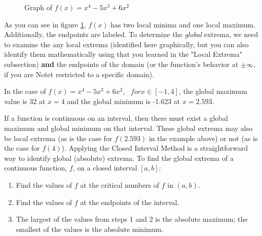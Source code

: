 \begin{figure}[htbp]
  \centering
  \caption{Graph of \( f(x) = x^4-5x^3+6x^2 \) }
  \label{fig:globalext}
\end{figure}

As you can see in figure \ref{fig:globalext}, $f(x)$ has two local minima and 
one local maximum. Additionally, the endpoints are labeled. To determine the 
\textit{global} extrema, we need to examine the any local extrema (identified 
here graphically, but you can also identify them mathematically using that you 
learned in the "Local Extrema" subsection) \textbf{and} the endpoints of the domain (or 
the function's behavior at $\pm \infty$, if you are Notet restricted to a specific 
domain). 

In the case of $f(x) = x^4-5x^3+6x^2,\text{ }for x\in [-1,4]$, the global 
maximum value is 32 at $x=4$ and the global minimum is -1.623 at $x=2.593$. 

If a function is continuous on an interval, then there must exist a global 
maximum and global minimum on that interval. These global extrema may also be 
local extrema (as is the case for $f(2.593)$ in the example above) or not (as 
is the case for $f(4)$). Applying the Closed Interval Method is a 
straightforward way to identify global (absolute) extrema. To find the global 
extrema of a continuous function, $f$, on a closed interval $[a, b]$:
\begin{enumerate}
	\item Find the values of $f$ at the critical numbers of $f$ in $(a, b)$.
	\item Find the values of $f$ at the endpoints of the interval.
	\item The largest of the values from steps 1 and 2 is the absolute maximum; 
	the smallest of the values is the absolute minimum.
\end{enumerate}

